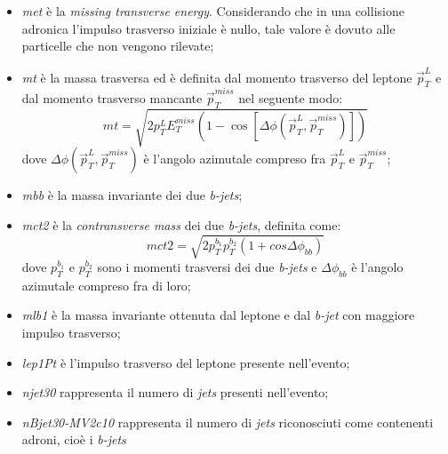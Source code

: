 \begin{itemize}
	\item \textit{met} è la \textit{missing transverse energy}. Considerando che in una collisione adronica l'impulso trasverso iniziale è nullo, tale valore è dovuto alle particelle che non vengono rilevate;
	
	\item \textit{mt} è la massa trasversa ed è definita dal momento trasverso del leptone $\vec{p}_T^L$ e dal momento trasverso mancante $\vec{p}_T^{miss}$ nel seguente modo:
		\begin{equation}
			mt = \sqrt{2p_T^L E_T^{miss}(1 - \cos[\Delta\phi (\vec{p}_T^L , \vec{p}_T^{miss})])}
		\end{equation}
	dove $\Delta\phi(\vec{p}_T^L , \vec{p}_T^{miss})$ è l'angolo azimutale compreso fra $\vec{p}_T^L$ e $\vec{p}_T^{miss}$;
	
	\item \textit{mbb} è la massa invariante dei due \textit{b-jets};
	
	\item \textit{mct2} è la \textit{contransverse mass} dei due \textit{b-jets}, definita come:
		\begin{equation}
			mct2 = \sqrt{2p_T^{b_1} p_T^{b_2} (1 + cos \Delta\phi_{bb})}
		\end{equation}
	dove $p_T^{b_1}$ e $p_T^{b_2}$ sono i momenti trasversi dei due \textit{b-jets} e $\Delta\phi_{bb}$ è l'angolo azimutale compreso fra di loro;
	
	\item \textit{mlb1} è la massa invariante ottenuta dal leptone e dal \textit{b-jet} con maggiore impulso trasverso;
	
	\item \textit{lep1Pt} è l'impulso trasverso del leptone presente nell'evento;
	
	\item \textit{njet30} rappresenta il numero di \textit{jets} presenti nell'evento;
	
	\item \textit{nBjet30-MV2c10} rappresenta il numero di \textit{jets} riconosciuti come contenenti adroni, cioè i \textit{b-jets}
\end{itemize} 

